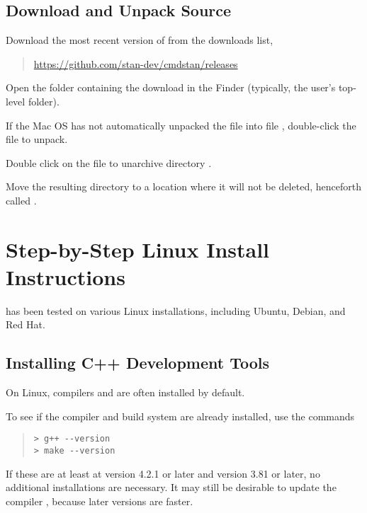 \subsection{Download and Unpack \CmdStan Source}

Download the most recent version of  from
the \CmdStan downloads list,
%
\begin{quote}
\url{https://github.com/stan-dev/cmdstan/releases}
\end{quote}

Open the folder containing the download in the Finder
(typically, the user's top-level  folder).

If the Mac OS has not automatically unpacked the 
file into file ,
double-click the  file to unpack.

Double click on the  file to unarchive
directory .

Move the resulting directory to a location where it will not be
deleted, henceforth called .


\section{Step-by-Step Linux Install Instructions}\label{install-linux.appendix}

\CmdStan has been tested on various Linux installations, including
Ubuntu, Debian, and Red Hat.

\subsection{Installing C++ Development Tools}

On Linux, \Cpp compilers and  are often installed by
default.

To see if the  compiler and  build system
are already installed, use the commands
%
\begin{quote}
\begin{Verbatim}[fontshape=sl,fontsize=\small]
> g++ --version
> make --version
\end{Verbatim}
\end{quote}
%
If these are at least at  version 4.2.1 or later and
 version 3.81 or later, no additional installations are
necessary.  It may still be desirable to update the \Cpp compiler
, because later versions are faster.

